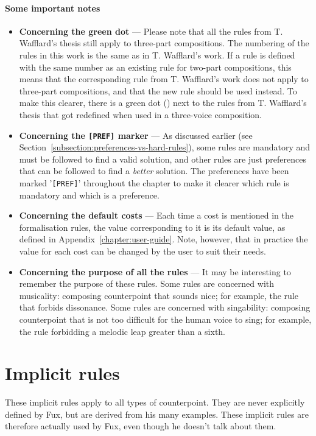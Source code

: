\paragraph*{Some important notes}
\begin{itemize}
    \item \textbf{Concerning the green dot} ---
    Please note that all the rules from T. Wafflard's thesis still apply to three-part compositions. The numbering of the rules in this work is the same as in T. Wafflard's work. If a rule is defined with the same number as an existing rule for two-part compositions, this means that the corresponding rule from T. Wafflard's work does not apply to three-part compositions, and that the new rule should be used instead. To make this clearer, there is a green dot (\greendot) next to the rules from T. Wafflard's thesis that got redefined when used in a three-voice composition.
    \item \textbf{Concerning the \texttt{[PREF]} marker} ---
    As discussed earlier (see Section~\ref{subsection:preferences-vs-hard-rules}), some rules are mandatory and must be followed to find a valid solution, and other rules are just preferences that can be followed to find a \textit{better} solution. The preferences have been marked '\texttt{[PREF]}' throughout the chapter to make it clearer which rule is mandatory and which is a preference.

    \item \textbf{Concerning the default costs} --- Each time a cost is mentioned in the formalisation rules, the value corresponding to it is its default value, as defined in Appendix~\ref{chapter:user-guide}. Note, however, that in practice the value for each cost can be changed by the user to suit their needs.
    \item \textbf{Concerning the purpose of all the rules} --- 
    It may be interesting to remember the purpose of these rules. Some rules are concerned with musicality: composing counterpoint that sounds nice; for example, the rule that forbids dissonance. Some rules are concerned with singability: composing counterpoint that is not too difficult for the human voice to sing; for example, the rule forbidding a melodic leap greater than a sixth.

\end{itemize}

\section{Implicit rules}
These implicit rules apply to all types of counterpoint. They are never explicitly defined by Fux, but are derived from his many examples. These implicit rules are therefore actually used by Fux, even though he doesn't talk about them.

